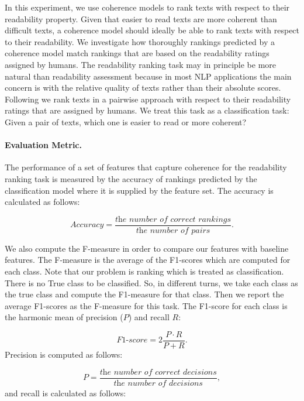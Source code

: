 In this experiment, we use coherence models to rank texts with respect to their readability property. 
Given that easier to read texts are more coherent than difficult texts, a coherence model should ideally be able to rank texts with respect to their readability. 
We investigate how thoroughly rankings predicted by a coherence model match rankings that are based on the readability ratings assigned by humans. 
The readability ranking task may in principle be more natural than readability assessment because in most NLP applications the main concern is with the relative quality of texts rather than their absolute scores. 
Following  we rank texts in a pairwise approach with respect to their readability ratings that are assigned by humans. 
We treat this task as a classification task: Given a pair of texts, which one is easier to read or more coherent?

\paragraph{Evaluation Metric.}
The performance of a set of features that capture coherence for the readability ranking task is measured by the accuracy of rankings predicted by the classification model where it is supplied by the feature set. 
The accuracy is calculated as follows:

\begin{equation}
Accuracy = \frac{\textit{the number of correct rankings}}{\textit{the number of pairs}}. 
\end{equation} 

We also compute the F-measure in order to compare our features with baseline features. 
The F-measure is the average of the F1-scores which are computed for each class. 
Note that our problem is ranking which is treated as classification. 
There is no True class to be classified. 
So, in different turns, we take each class as the true class and compute the F1-measure for that class. 
Then we report the average F1-scores as the F-measure for this task. 
The F1-score for each class is the harmonic mean of precision ($P$) and recall $R$:

\begin{equation}
\textit{F1-score} = 2\frac{P \cdot R}{P + R}.  
\end{equation}
Precision is computed as follows: 

\begin{equation}
P = \frac{\textit{the number of correct decisions}}{\textit{the number of decisions}},
\end{equation}
and recall is calculated as follows:

